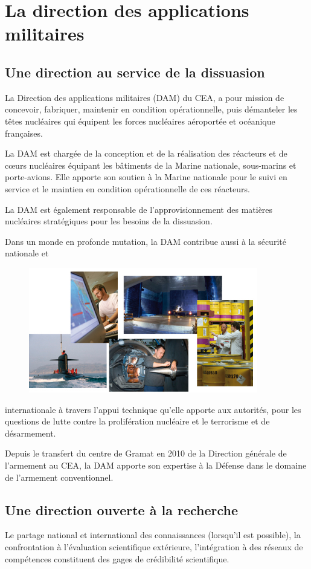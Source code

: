 \documentclass[12pt,a4paper,twoside]{article}
\begin{document}
\newpage

\section{La direction des applications militaires}

\subsection*{Une direction au service de la dissuasion}
La Direction des applications militaires (DAM) du CEA, a pour mission
de concevoir, fabriquer, maintenir en condition opérationnelle, puis démanteler
les têtes nucléaires qui équipent les forces nucléaires aéroportée et océanique
françaises.

La DAM est chargée de la conception et de la réalisation des réacteurs et de
c\oe urs nucléaires équipant les bâtiments de la Marine nationale, sous-marins
et porte-avions. Elle apporte son soutien à la Marine nationale pour le suivi en
service et le maintien en condition opérationnelle de ces réacteurs.

La DAM est également responsable de l'approvisionnement des matières nucléaires
straté\-giques pour les besoins de la dissuasion.

Dans un monde en profonde mutation, la DAM contribue aussi à la sécurité
nationale et
\begin{figure}
	\includegraphics[width=10cm]{ressources/images/dam/5_thumbnails.jpg}
\end{figure}
internationale à travers l'appui technique qu'elle apporte aux autorités, pour
les questions de lutte contre la prolifération nucléaire et le terrorisme et de
désarmement.

Depuis le transfert du centre de Gramat en 2010 de la Direction générale de
l'armement au CEA, la DAM apporte son expertise à la Défense dans le domaine de
l'armement conventionnel.

\subsection*{Une direction ouverte à la recherche}
Le partage national et international des connaissances (lorsqu'il est possible),
la confrontation à l'évaluation scientifique extérieure, l'intégration à des
réseaux de compétences constituent des gages de crédibilité scientifique.
\end{document}
